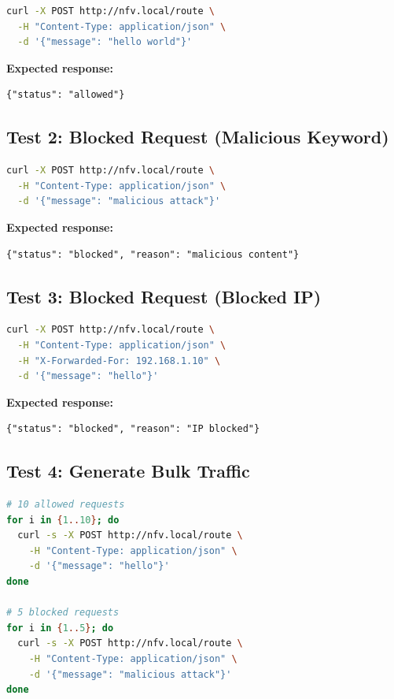 \documentclass[12pt,a4paper]{article}
\begin{document}
\begin{lstlisting}[language=bash]
curl -X POST http://nfv.local/route \
  -H "Content-Type: application/json" \
  -d '{"message": "hello world"}'
\end{lstlisting}

\textbf{Expected response:}
\begin{verbatim}
{"status": "allowed"}
\end{verbatim}

\subsection{Test 2: Blocked Request (Malicious Keyword)}

\begin{lstlisting}[language=bash]
curl -X POST http://nfv.local/route \
  -H "Content-Type: application/json" \
  -d '{"message": "malicious attack"}'
\end{lstlisting}

\textbf{Expected response:}
\begin{verbatim}
{"status": "blocked", "reason": "malicious content"}
\end{verbatim}

\subsection{Test 3: Blocked Request (Blocked IP)}

\begin{lstlisting}[language=bash]
curl -X POST http://nfv.local/route \
  -H "Content-Type: application/json" \
  -H "X-Forwarded-For: 192.168.1.10" \
  -d '{"message": "hello"}'
\end{lstlisting}

\textbf{Expected response:}
\begin{verbatim}
{"status": "blocked", "reason": "IP blocked"}
\end{verbatim}

\subsection{Test 4: Generate Bulk Traffic}

\begin{lstlisting}[language=bash]
# 10 allowed requests
for i in {1..10}; do
  curl -s -X POST http://nfv.local/route \
    -H "Content-Type: application/json" \
    -d '{"message": "hello"}'
done

# 5 blocked requests
for i in {1..5}; do
  curl -s -X POST http://nfv.local/route \
    -H "Content-Type: application/json" \
    -d '{"message": "malicious attack"}'
done
\end{lstlisting}
\end{document}
